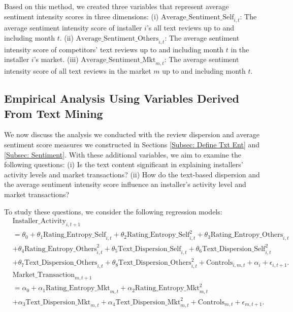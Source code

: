 \documentclass[msom,blindrev]{informs3}
\begin{document}
Based on this method, we created three variables that represent average sentiment intensity scores in three dimensions: (i) $\text{Average\_Sentiment\_Self}_{i,t}$: The average sentiment intensity score of installer $i$'s all text reviews up to and including month $t$. (ii) $\text{Average\_Sentiment\_Others}_{i,t}$: The average sentiment intensity score of competitors' text reviews up to and including month $t$ in the installer $i$'s market. (iii) $\text{Average\_Sentiment\_Mkt}_{m,t}$: The average sentiment intensity score of all text reviews in the market $m$ up to and including month $t$.

\subsection{Empirical Analysis Using Variables Derived From Text Mining}

We now discuss the analysis we conducted with the review dispersion and average sentiment score measures we constructed in Sections \ref{Subsec: Define Txt Ent} and \ref{Subsec: Sentiment}. With these additional variables, we aim to examine the following questions: (i) Is the text content significant in explaining installers' activity levels and market transactions? (ii) How do the text-based dispersion and the average sentiment intensity score influence an installer's activity level and market transactions? %




To study these questions, we consider the following regression models:
\begin{align}  \nonumber
& \text{Installer\_Activity}_{i,t+1} \\ \nonumber
& = \theta_{0}+ \theta_{1} \text{Rating\_Entropy\_Self}_{i,t}+ \theta_{2} \text{Rating\_Entropy\_Self}_{i,t}^ {2} + \theta_{3} \text{Rating\_Entropy\_Others}_{i,t} \\ \nonumber
& + \theta_{4} \text{Rating\_Entropy\_Others}_{i,t}^{2} + \theta_{5} \text{Text\_Dispersion\_Self}_{i,t}+  \theta_{6}  \text{Text\_Dispersion\_Self}_{i,t}^ {2}  \\ \label{model_ind_textbased}
&+ \theta_{7}  \text{Text\_Dispersion\_Others}_{i,t} + \theta_{8} \text{Text\_Dispersion\_Others}_{i,t}^{2}  + \text{Controls}_{i,m,t}+ \alpha_{i} + \epsilon_{i,t+1}.\\ \nonumber
   & \text{Market\_Transaction}_{m,t+1} \\ \nonumber
   & =  \alpha_{0} + \alpha_{1} \text{Rating\_Entropy\_Mkt}_{m,t}+  \alpha_{2} \text{Rating\_Entropy\_Mkt}_{m,t}^2 \\ \label{reg: market-level-textbased}
   &+ \alpha_{3} \text{Text\_Dispersion\_Mkt}_{m,t}+ \alpha_{4} \text{Text\_Dispersion\_Mkt}_{m,t}^2  + \text{Controls}_{m,t}  + \epsilon_{m,t+1}.
\end{align}
\end{document}
